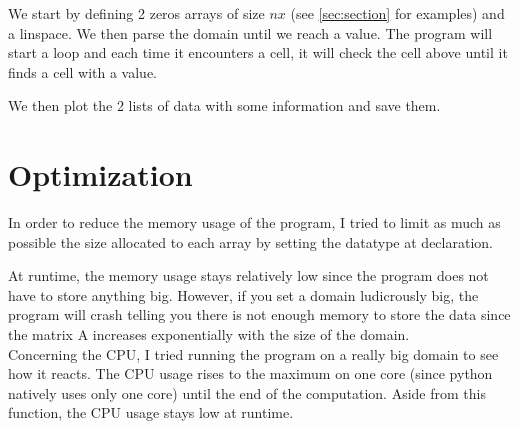 We start by defining 2 zeros arrays of size $nx$ (see
\autoref{sec:section} for examples) and a linspace. We then parse the domain
until we reach a  value. The program will start a loop and each time
it encounters a  cell, it will check the cell above until it finds
a cell with a  value.

We then plot the 2 lists of data with some information and save them.

\newpage
\part{Optimization}
In order to reduce the memory usage of the program, I tried to limit as much
as possible the size allocated to each array by setting the datatype at
declaration.

At runtime, the memory usage stays relatively low since the program does not
have to store anything big. However, if you set a domain ludicrously big,
the program will crash telling you there is not enough memory to store the data
since the matrix A increases exponentially with the size of the domain.\\
Concerning the CPU, I tried running the program on a really big domain to see
how it reacts. The CPU usage rises to the maximum on one core (since python
natively uses only one core) until the end of the 
computation. Aside from this function, the CPU usage stays low at runtime.

